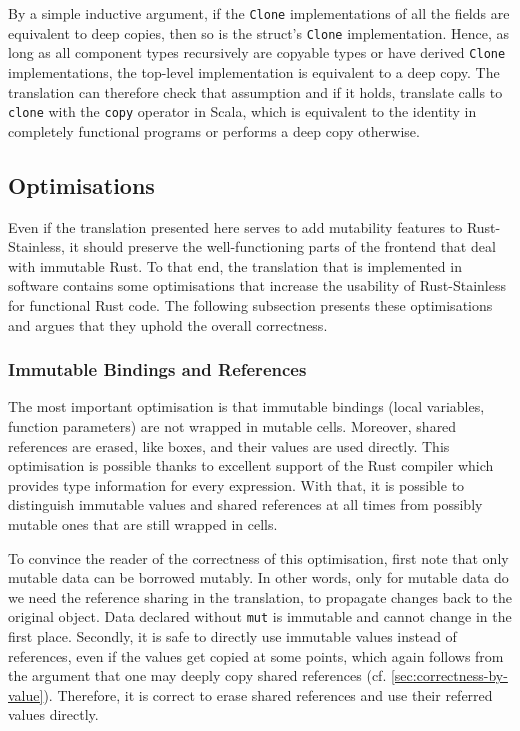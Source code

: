 By a simple inductive argument, if the \lstinline!Clone! implementations of all
the fields are equivalent to deep copies, then so is the struct's
\lstinline!Clone! implementation. Hence, as long as all component types
recursively are copyable types or have derived \lstinline!Clone!
implementations, the top-level implementation is equivalent to a deep copy. The
translation can therefore check that assumption and if it holds, translate calls
to \lstinline!clone! with the \lstinline!copy! operator in Scala, which is
equivalent to the identity in completely functional programs or performs a deep
copy otherwise.



\subsection{Optimisations}
\label{optimisations}

Even if the translation presented here serves to add mutability features to
Rust-Stainless, it should preserve the well-functioning parts of the frontend
that deal with immutable Rust. To that end, the translation that is implemented
in software contains some optimisations that increase the usability of
Rust-Stainless for functional Rust code. The following subsection presents these
optimisations and argues that they uphold the overall correctness.


\subsubsection{Immutable Bindings and References}

The most important optimisation is that immutable bindings (local variables,
function parameters) are not wrapped in mutable cells. Moreover, shared
references are erased, like boxes, and their values  are used directly. This
optimisation is possible thanks to excellent support of the Rust compiler which
provides type information for every expression. With that, it is possible to
distinguish immutable values and shared references at all times from possibly
mutable ones that are still wrapped in cells.

To convince the reader of the correctness of this optimisation, first note that
only mutable data can be borrowed mutably. In other words, only for mutable data
do we need the reference sharing in the translation, to propagate changes back
to the original object. Data declared without \lstinline!mut! is immutable and
cannot change in the first place. Secondly, it is safe to directly use immutable
values instead of references, even if the values get copied at some points,
which again follows  from the argument that one may deeply copy shared
references (cf. \autoref{sec:correctness-by-value}). Therefore, it is correct to
erase shared references and use their referred values directly.

